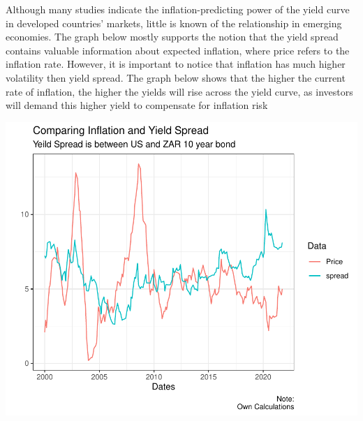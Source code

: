 \documentclass[11pt,preprint, authoryear]{elsarticle}
\numberwithin{equation}{section}
\numberwithin{figure}{section}
\numberwithin{table}{section}
\begin{document}
Although many studies indicate the inflation-predicting power of the
yield curve in developed countries' markets, little is known of the
relationship in emerging economies. The graph below mostly supports the
notion that the yield spread contains valuable information about
expected inflation, where price refers to the inflation rate. However,
it is important to notice that inflation has much higher volatility then
yield spread. The graph below shows that the higher the current rate of
inflation, the higher the yields will rise across the yield curve, as
investors will demand this higher yield to compensate for inflation risk

\includegraphics{Question1_files/figure-latex/unnamed-chunk-6-1.pdf}


\end{document}
